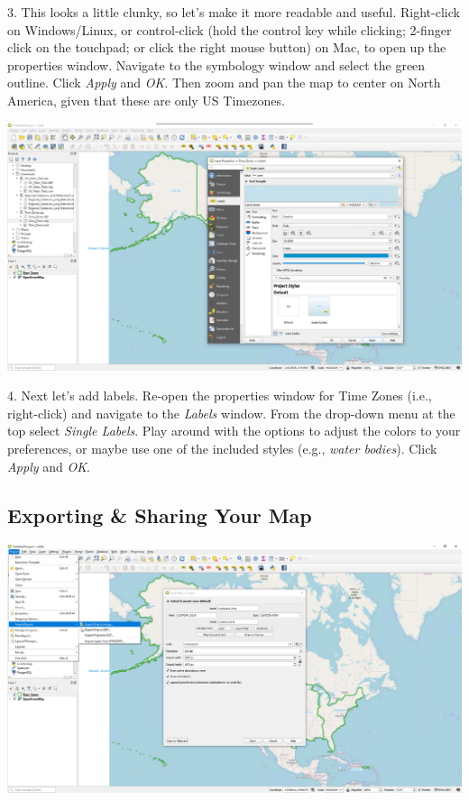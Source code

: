 \documentclass[oneside,a4paper,11pt,explicit]{book}
\begin{document}
3. This looks a little clunky, so let's make it more readable and useful. Right-click on Windows/Linux, or control-click (hold the control key while clicking; 2-finger click on the touchpad; or click the right mouse button) on Mac, to open up the properties window. Navigate to the symbology window and select the green outline. Click \textit{Apply} and \textit{OK}.  Then zoom and pan the map to center on North America, given that these are only US Timezones.

\centerline{\includegraphics[width=\textwidth]{TimeZoneLabels.png}}

4. Next let's add labels. Re-open the properties window for Time Zones (i.e., right-click) and navigate to the \textit{Labels} window. From the drop-down menu at the top select \textit{Single Labels}. Play around with the options to adjust the colors to your preferences, or maybe use one of the included styles (e.g., \textit{water bodies}). Click \textit{Apply} and \textit{OK}. 

\subsection{Exporting \& Sharing Your Map}

\centerline{\includegraphics[width=\textwidth]{Export.png}}
\end{document}
